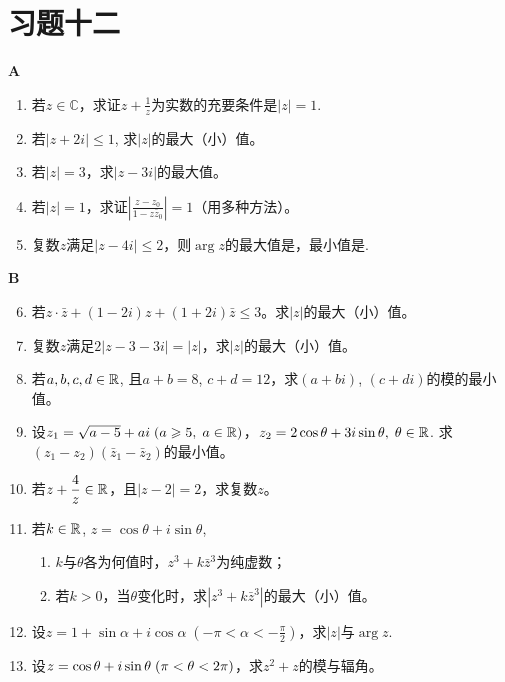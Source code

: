 \section*{习题十二}
\begin{center}
    \bfseries A
\end{center}

\begin{enumerate}
    \item 若$z\in\mathbb{C}$，求证$z+\frac{1}{z}$为实数的充要条件是$|z|=1$.
    \item   若$|z+2i|\le 1$, 求$|z|$的最大（小）值。
    \item   若$|z|=3$，求$|z-3i|$的最大值。
    \item   若$|z|=1$，求证$\left|\frac{z-z_0}{1-z\bar z_0}\right|=1$（用多种方法）。
    \item   复数$z$满足$|z-4i|\le 2$，则$\arg z$的最大值是\blank，最小值是\blank.
\end{enumerate}

\begin{center}
    \bfseries B
\end{center}

\begin{enumerate}\setcounter{enumi}{5}
    \item 若$z\cdot \bar z+(1-2i)z+(1+2i)\bar z\le 3$。求$|z|$的最大（小）值。
\item 复数$z$满足$2|z-3-3i|=|z|$，求$|z|$的最大（小）值。
\item 若$a,b,c,d\in\mathbb{R}$, 且$a+b=8$, $c+d=12$，求$(a+bi)$, $(c+di)$的模的最小值。
\item 设$z_1=\sqrt{a-5}+ai\; (a\geqslant 5,\; a\in\mathbb{R})$，$z_2=2\cos\theta+3i\sin\theta,\; \theta\in\mathbb{R}$. 求$(z_1-z_2)(\bar z_1-\bar z_2)$的最小值。
\item 若$z+\dfrac{4}{z}\in\mathbb{R}$，且$|z-2|=2$，求复数$z$。
\item 若$k\in\mathbb{R}$, $z=\cos\theta+i\sin\theta$,
\begin{enumerate}[(1)]
\item $k$与$\theta$各为何值时，$z^3+k\bar z^3$为纯虚数；
\item 若$k>0$，当$\theta$变化时，求$|z^3+k\bar z^3|$的最大（小）值。
\end{enumerate}

    \item 设$z=1+\sin\alpha+i\cos\alpha\; \left(-\pi<\alpha<-\frac{\pi}{2}\right)$，求$|z|$与$\arg z$.
    \item 设$z=\cos\theta+i\sin\theta\; (\pi<\theta<2\pi)$，求$z^2+z$的模与辐角。
\end{enumerate}


